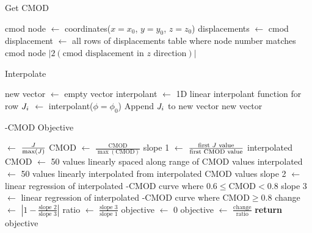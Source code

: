\begin{algorithm}[tbp]
  \caption{Get CMOD}
  \label{alg:get_cmod}
  \begin{algorithmic}
  \State cmod node $\gets$ coordinates($x = x_0$, $y = y_0$, $z = z_0$)
  \State displacements $\gets$ 
  \State cmod displacement $\gets$ all rows of displacements table where node number matches cmod node
  \State \Return $|2(\text{cmod displacement in $z$ direction})|$
  \EndProcedure
  \end{algorithmic}
\end{algorithm}

\begin{algorithm}[tbp]
  \caption{Interpolate \J}
  \label{alg:interpolate_j}
  \begin{algorithmic}
  \State new \J vector $\gets$ empty vector
    \State \J interpolant $\gets$ 1D linear interpolant function for row 
    \State $J_i$ $\gets$ \J interpolant($\phi = \phi_0$)
    \State Append $J_i$ to new \J vector
  \EndFor
  \Return new \J vector
  \EndProcedure
  \end{algorithmic}
\end{algorithm}

\begin{algorithm}[tbp]
  \caption{\J-CMOD Objective}
  \label{alg:j_cmod_objective}
  \begin{algorithmic}
    \State \J $\gets$ $\frac{J}{\max(J)}$ 
    \State CMOD $\gets$ $\frac{\text{CMOD}}{\max(\text{CMOD})}$ 
    \State slope 1 $\gets$ $\frac{\text{first } J \text{ value}}{\text{first CMOD value}}$ 
    \State interpolated CMOD $\gets$ 50 values linearly spaced along range of CMOD values
    \State {}
    \State interpolated \J $\gets$ 50 values linearly interpolated from interpolated CMOD values
    \State slope 2 $\gets$ linear regression of interpolated \J-CMOD curve where $0.6 \leq \text{CMOD} < 0.8$
    \State slope 3 $\gets$ linear regression of interpolated \J-CMOD curve where $\text{CMOD}\geq 0.8$
    \State change $\gets$ $\left| 1-\frac{\text{slope 2}}{\text{slope 3}} \right|$
    \State ratio $\gets$ $\frac{\text{slope 3}}{\text{slope 1}}$
      \State objective $\gets$ 0
    \Else
      \State objective $\gets$ $\frac{\text{change}}{\text{ratio}}$ 
    \EndIf
    \State \textbf{return} objective
    \EndProcedure
  \end{algorithmic}
\end{algorithm}

